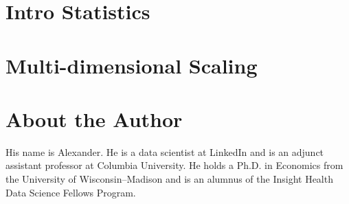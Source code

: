 \documentclass{tex/kdp} %
\begin{document}
\chapter{Intro Statistics}\label{chapter:stats}


\chapter{Multi-dimensional Scaling}\label{chapter:mds}




\backmatter
\printbibliography
\chapter*{About the Author}
His name is Alexander. He is a data scientist at LinkedIn and is an adjunct assistant professor at Columbia University. He holds a Ph.D. in Economics from the University of Wisconsin–Madison and is an alumnus of the Insight Health Data Science Fellows Program. \faHandPeaceO
\end{document}
